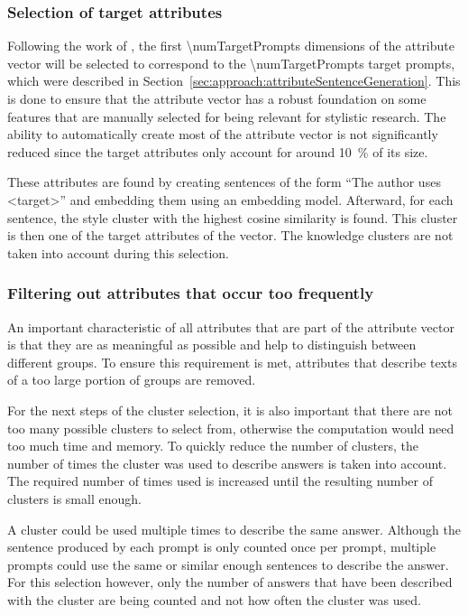 \subsubsection{Selection of target attributes}
\label{sec:experiments_evaluation:selection:targetAttributes}
Following the work of \citet{patelLearningInterpretableStyle2023}, the first \num{\numTargetPrompts} dimensions of the attribute vector will be selected to correspond to the \num{\numTargetPrompts} target prompts, which were described in Section~\ref{sec:approach:attributeSentenceGeneration}.
This is done to ensure that the attribute vector has a robust foundation on some features that are manually selected for being relevant for stylistic research. The ability to automatically create most of the attribute vector is not significantly reduced since the target attributes only account for around \SI{10}{\percent} of its size. %

These attributes are found by creating sentences of the form \enquote{The author uses <target>} and embedding them using an embedding model.
Afterward, for each sentence, the style cluster with the highest cosine similarity is found. This cluster is then one of the target attributes of the vector. The knowledge clusters are not taken into account during this selection.


\subsubsection{Filtering out attributes that occur too frequently}
\label{sec:experiments_evaluation:selection:filteringOccurance}
An important characteristic of all attributes that are part of the attribute vector is that they are as meaningful as possible and help to distinguish between different groups. To ensure this requirement is met, attributes that describe texts of a too large portion of groups are removed.

For the next steps of the cluster selection, it is also important that there are not too many possible clusters to select from, otherwise the computation would need too much time and memory. To quickly reduce the number of clusters, the number of times the cluster was used to describe answers is taken into account. The required number of times used is increased until the resulting number of clusters is small enough.

A cluster could be used multiple times to describe the same answer. Although the sentence produced by each prompt is only counted once per prompt, multiple prompts could use the same or similar enough sentences to describe the answer. For this selection however, only the number of answers that have been described with the cluster are being counted and not how often the cluster was used.

